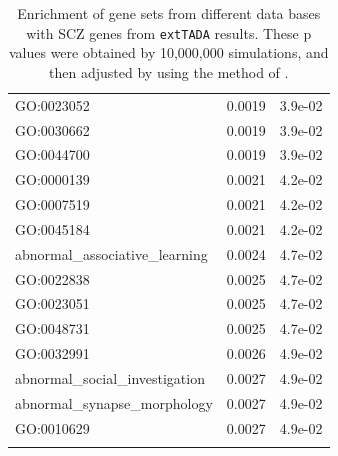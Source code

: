 \documentclass[]{article}
\begin{document}
\begin{longtable}{|l|r|r|}
GO:0023052  &  0.0019  &  3.9e-02 \\
GO:0030662  &  0.0019  &  3.9e-02 \\
GO:0044700  &  0.0019  &  3.9e-02 \\
GO:0000139  &  0.0021  &  4.2e-02 \\
GO:0007519  &  0.0021  &  4.2e-02 \\
GO:0045184  &  0.0021  &  4.2e-02 \\
abnormal\_associative\_learning  &  0.0024  &  4.7e-02 \\
GO:0022838  &  0.0025  &  4.7e-02 \\
GO:0023051  &  0.0025  &  4.7e-02 \\
GO:0048731  &  0.0025  &  4.7e-02 \\
GO:0032991  &  0.0026  &  4.9e-02 \\
abnormal\_social\_investigation  &  0.0027  &  4.9e-02 \\
abnormal\_synapse\_morphology  &  0.0027  &  4.9e-02 \\
GO:0010629  &  0.0027  &  4.9e-02 \\
\hline
\caption{Enrichment of gene sets from different data bases with SCZ
  genes from \texttt{extTADA} results. These p values were obtained by 10,000,000 simulations, and then adjusted by using the method of \cite{benjamini1995controlling}.}
\label{tab:enrichmentGeneSetDataDrivenApproach}
\end{longtable}
\end{document}

